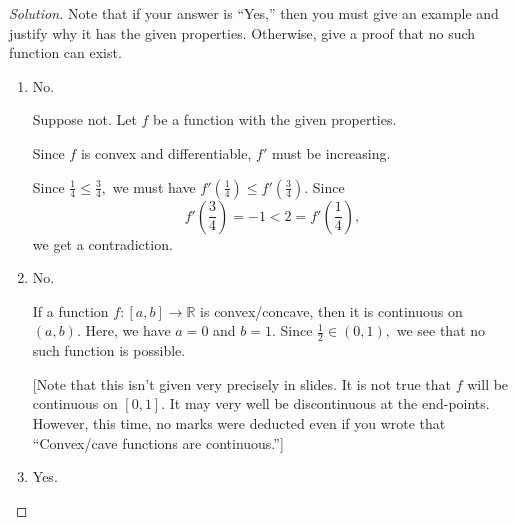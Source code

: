 \documentclass[12pt]{article}
\theoremstyle{definition}
\newenvironment{soln}{\begin{proof}[Solution]}{\end{proof}}
\newcommand{\remark}[1]{{\color{gray}[#1]}}
\begin{document}
\begin{soln}
	Note that if your answer is ``Yes,'' then you must give an example and justify why it has the given properties. Otherwise, give a proof that no such function can exist.
	\begin{enumerate}[leftmargin=*]
		\item {\color{red}No}.

		Suppose not. Let $f$ be a function with the given properties. 

		Since $f$ is convex and differentiable, $f'$ must be increasing.

		Since $\frac{1}{4} \le \frac{3}{4},$ we must have $f'\left(\frac{1}{4}\right) \le f'\left(\frac{3}{4}\right).$ Since 
		\begin{equation*} 
			f'\left(\frac{3}{4}\right) = -1 < 2 = f'\left(\frac{1}{4}\right),
		\end{equation*} we get a contradiction.
		\item {\color{red}No}.

		If a function $f:[a, b] \to \mathbb{R}$ is convex/concave, then it is continuous on $(a, b).$ Here, we have $a = 0$ and $b = 1.$ Since $\frac{1}{2} \in (0, 1),$ we see that no such function is possible.

		\remark{Note that this isn't given very precisely in slides. It is not true that $f$ will be continuous on $[0, 1].$ It may very well be discontinuous at the end-points. However, this time, no marks were deducted even if you wrote that ``Convex/cave functions are continuous.''}
		\item {\color{blue}Yes}.


\end{enumerate}
\end{soln}
\end{document}
